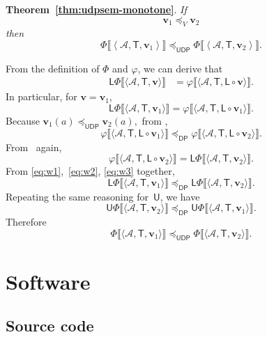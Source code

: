 \documentclass[twocolumn,english]{IEEEconf}
\theoremstyle{plain}
\theoremstyle{definition}
\theoremstyle{definition}
\theoremstyle{plain}
\newcommand{\aword}[1]{\mathsf{#1}}
\newcommand{\vmath}[1]{\aword{#1}}
\newcommand{\posleq}{\preceq}
\newcommand{\udpL}{\boldsymbol{\mathsf{L}}}
\newcommand{\udpU}{\boldsymbol{\mathsf{U}}}
\newcommand{\udpsp}{\vmath{UDP}}
\newcommand{\udpleq}{\posleq_\udpsp}
\newcommand{\dpsp}{\vmath{DP}}
\newcommand{\dpleq}{\posleq_\dpsp}
\newcommand{\udpsem}{\Phi}
\newcommand{\dpsem}{\varphi}
\newcommand{\atoms}{\mathcal{A}}
\newcommand{\atree}{\boldsymbol{\vmath{T}}}
\newcommand{\val}{\boldsymbol{v}}
\begin{document}
\textbf{Theorem~\ref{thm:udpsem-monotone}}. \emph{If 
\[
\val_{1}\posleq_{V}\val_{2}
\]
then
\[
\udpsem\llbracket\left\langle \atoms,\atree,\val_{1}\right\rangle \rrbracket\udpleq\udpsem\llbracket\left\langle \atoms,\atree,\val_{2}\right\rangle \rrbracket.
\]
}
\begin{IEEEproof}
From the definition of $\udpsem$ and $\dpsem$, we can derive that
\begin{align}
\udpL\udpsem\llbracket\langle\atoms,\atree,\val\rangle\rrbracket & =\dpsem\llbracket\langle\atoms,\atree,\udpL\circ\val\rangle\rrbracket.\label{eq:equiv1}
\end{align}
In particular, for $\val=\val_{1}$,
\begin{equation}
\udpL\udpsem\llbracket\langle\atoms,\atree,\val_{1}\rangle\rrbracket=\dpsem\llbracket\langle\atoms,\atree,\udpL\circ\val_{1}\rangle\rrbracket.\label{eq:w1}
\end{equation}
Because $\val_{1}(a)\udpleq\val_{2}(a),$ from ,
\begin{equation}
\dpsem\llbracket\langle\atoms,\atree,\udpL\circ\val_{1}\rangle\rrbracket\dpleq\dpsem\llbracket\langle\atoms,\atree,\udpL\circ\val_{2}\rangle\rrbracket.\label{eq:w2}
\end{equation}
From~ again, 
\begin{equation}
\dpsem\llbracket\langle\atoms,\atree,\udpL\circ\val_{2}\rangle\rrbracket=\udpL\udpsem\llbracket\langle\atoms,\atree,\val_{2}\rangle\rrbracket.\label{eq:w3}
\end{equation}
From \eqref{eq:w1},~\eqref{eq:w2}, \eqref{eq:w3} together, 
\[
\udpL\udpsem\llbracket\langle\atoms,\atree,\val_{1}\rangle\rrbracket\dpleq\udpL\udpsem\llbracket\langle\atoms,\atree,\val_{2}\rangle\rrbracket.
\]
 Repeating the same reasoning for~$\udpU$, we have 
\[
\udpU\udpsem\llbracket\langle\atoms,\atree,\val_{2}\rangle\rrbracket\dpleq\udpU\udpsem\llbracket\langle\atoms,\atree,\val_{1}\rangle\rrbracket.
\]
 Therefore 
\[
\udpsem\llbracket\langle\atoms,\atree,\val_{1}\rangle\rrbracket\udpleq\udpsem\llbracket\langle\atoms,\atree,\val_{2}\rangle\rrbracket.
\]
\end{IEEEproof}

\vfill\pagebreak

\section{Software}

\subsection{Source code}
\end{document}

